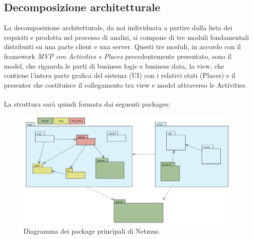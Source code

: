 \newpage
\subsection{Decomposizione architetturale}
La decomposizione architetturale, da noi individuata a partire dalla lista dei
requisiti e prodotta nel processo di analisi, si compone di tre moduli
fondamentali distribuiti su una parte client e una server. Questi tre moduli, in
accordo con il framework \emph{MVP con Activities e Places} precedentemente
presentato, sono il model, che riguarda le parti di business logic e business
data, la view, che contiene l'intera parte grafica del sistema (UI) con i
relativi stati (Places) e il presenter che costituisce il collegamento tra view
e model attraverso le Activities.
\\\\
La struttura sar\`a quindi formata dai seguenti packages:
\begin{figure}[h]
  \centering
  \includegraphics[width=16cm]{img/ST/PackageGeneric.png}
\caption{Diagramma dei package principali di Netmus.}
\end{figure}

